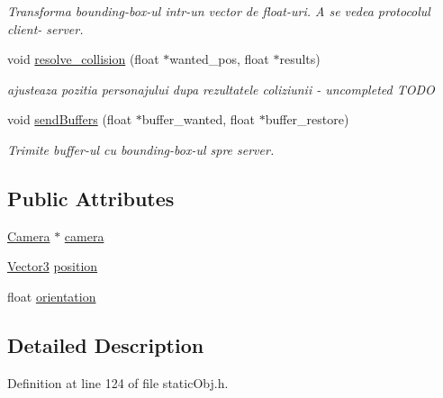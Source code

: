 \begin{DoxyCompactItemize}
\begin{DoxyCompactList}\small\item\em Transforma bounding-\/box-\/ul intr-\/un vector de float-\/uri. A se vedea protocolul client-\/ server. \end{DoxyCompactList}\item 
void \hyperlink{class_main_character_a8664ab320c6d2e258143119a03b7458f}{resolve\-\_\-collision} (float $\ast$wanted\-\_\-pos, float $\ast$results)
\begin{DoxyCompactList}\small\item\em ajusteaza pozitia personajului dupa rezultatele coliziunii -\/ uncompleted T\-O\-D\-O \end{DoxyCompactList}\item 
void \hyperlink{class_main_character_a0886ea364317c67aa139d6f3d25d69b5}{send\-Buffers} (float $\ast$buffer\-\_\-wanted, float $\ast$buffer\-\_\-restore)
\begin{DoxyCompactList}\small\item\em Trimite buffer-\/ul cu bounding-\/box-\/ul spre server. \end{DoxyCompactList}\end{DoxyCompactItemize}
\subsection*{Public Attributes}
\begin{DoxyCompactItemize}
\item 
\hyperlink{class_camera}{Camera} $\ast$ \hyperlink{class_main_character_aed23e5d05c1fb771c303d4f3e180aa66}{camera}
\item 
\hyperlink{struct_vector3}{Vector3} \hyperlink{class_main_character_ad8584e16c6e3f1b599fe9fad7511b14f}{position}
\item 
float \hyperlink{class_main_character_aa84b9f2c698f1247c8d95a60105cdbb7}{orientation}
\end{DoxyCompactItemize}


\subsection{Detailed Description}


Definition at line 124 of file static\-Obj.\-h.



